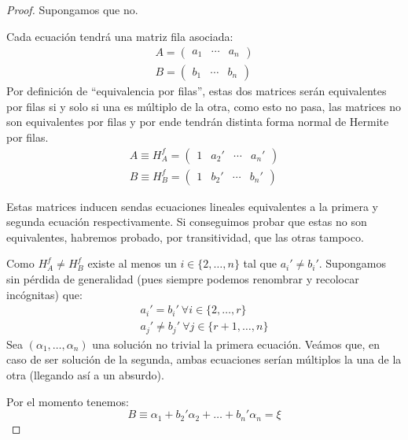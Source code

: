 \begin{proof}
	Supongamos que no.
	
	Cada ecuación tendrá una matriz fila asociada:
	\begin{gather*}
		A=\begin{pmatrix}
			a_1 & \cdots & a_n
		\end{pmatrix}\\
		B=\begin{pmatrix}
			b_1 & \cdots & b_n
		\end{pmatrix}
	\end{gather*}
	Por definición de ``equivalencia por filas'', estas dos matrices serán equivalentes por filas si y solo si una es múltiplo de la otra, como esto no pasa, las matrices no son equivalentes por filas y por ende tendrán distinta forma normal de Hermite por filas.
	\begin{gather*}
		A\equiv H_A^f=\begin{pmatrix}
			1 & a_2' & \cdots & a_n'
		\end{pmatrix}\\
		B\equiv H_B^f=\begin{pmatrix}
			1 & b_2' & \cdots & b_n'
		\end{pmatrix}
	\end{gather*}
	
	Estas matrices inducen sendas ecuaciones lineales equivalentes a la primera y segunda ecuación respectivamente. Si conseguimos probar que estas no son equivalentes, habremos probado, por transitividad, que las otras tampoco.
	
	Como $H_A^f\not=H_B^f$ existe al menos un $i\in\{2,\dots,n\}$ tal que $a_i'\not=b_i'$. Supongamos sin pérdida de generalidad (pues siempre podemos renombrar y recolocar incógnitas) que:
	\begin{gather*}
		a_i'=b_i'\ \forall i\in\{2,\dots,r\}\\
		a_j'\not=b_j'\ \forall j\in\{r+1,\dots,n\}
	\end{gather*}
	Sea $(\alpha_1,\dots,\alpha_n)$ una solución no trivial la primera ecuación. Veámos que, en caso de ser solución de la segunda, ambas ecuaciones serían múltiplos la una de la otra (llegando así a un absurdo).
	
	Por el momento tenemos:
	\[B\equiv\alpha_1+b_2'\alpha_2+\dots+b_n'\alpha_n=\xi\]
	

\end{proof}
